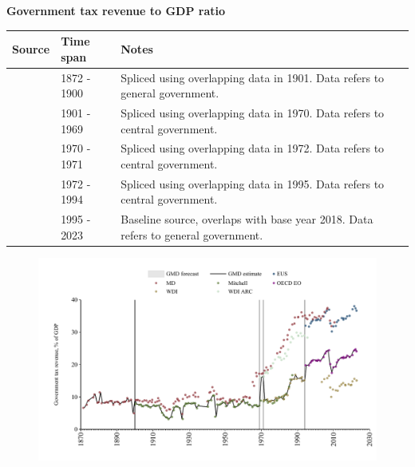 \documentclass[12pt,a4paper,landscape]{article}
\begin{document}
\begin{adjustbox}{max totalsize={\paperwidth}{\paperheight},center}
\begin{minipage}[t][\textheight][t]{\textwidth}
\vspace*{0.5cm}
{}
\begin{center}
{\Large\bfseries Government tax revenue to GDP ratio}
\end{center}
\vspace{0.5cm}
\begin{table}[H]
\centering
\small
\begin{tabular}{|l|l|l|}
\hline
\textbf{Source} & \textbf{Time span} & \textbf{Notes} \\
\hline
\rowcolor{white}\cite{MD}& 1872 - 1900 &Spliced using overlapping data in 1901. Data refers to general government.\\
\rowcolor{lightgray}\cite{Mitchell}& 1901 - 1969 &Spliced using overlapping data in 1970. Data refers to central government.\\
\rowcolor{white}\cite{WDI_ARC}& 1970 - 1971 &Spliced using overlapping data in 1972. Data refers to central government.\\
\rowcolor{lightgray}\cite{WDI}& 1972 - 1994 &Spliced using overlapping data in 1995. Data refers to central government.\\
\rowcolor{white}\cite{OECD_EO}& 1995 - 2023 &Baseline source, overlaps with base year 2018. Data refers to general government.\\
\hline
\end{tabular}
\end{table}
\begin{figure}[H]
\centering
\includegraphics[width=\textwidth,height=0.6\textheight,keepaspectratio]{graphs/ESP_govtax_GDP.pdf}
\end{figure}
\end{minipage}
\end{adjustbox}
\end{document}
